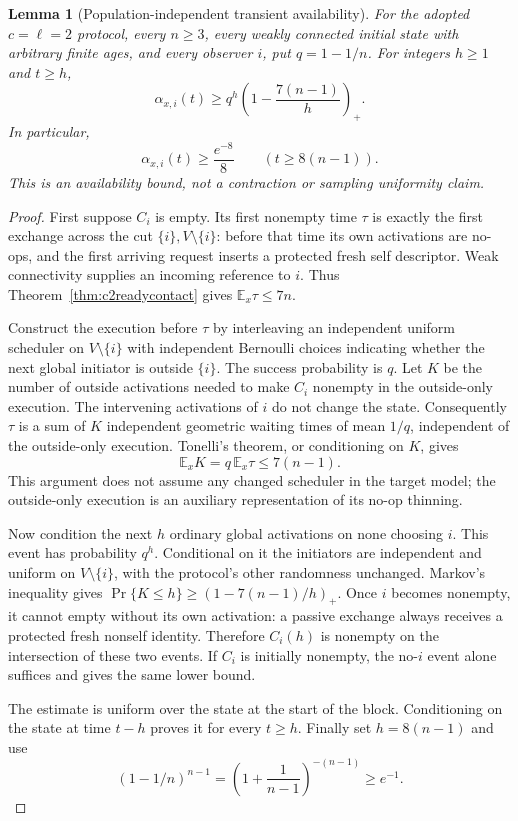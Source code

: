 \documentclass[11pt]{article}
\newtheorem{lemma}[theorem]{Lemma}
\begin{document}
\begin{lemma}[Population-independent transient availability]
\label{lem:c2constanttransientavailability}
For the adopted $c=\ell=2$ protocol, every $n\ge3$, every
weakly connected initial state with arbitrary finite ages,
and every observer $i$, put $q=1-1/n$. For integers $h\ge1$
and $t\ge h$,
\[
 \alpha_{x,i}(t)\ge
 q^h\left(1-\frac{7(n-1)}h\right)_+.
\]
In particular,
\[
 \alpha_{x,i}(t)\ge \frac{e^{-8}}8
 \qquad(t\ge8(n-1)).
\]
This is an availability bound, not a contraction or sampling
uniformity claim.
\end{lemma}
\begin{proof}
First suppose $C_i$ is empty. Its first nonempty time $\tau$
is exactly the first exchange across the cut
$\{i\},V\setminus\{i\}$: before that time its own activations
are no-ops, and the first arriving request inserts a protected
fresh self descriptor. Weak connectivity supplies an incoming
reference to $i$. Thus Theorem~\ref{thm:c2readycontact} gives
$\mathbb E_x\tau\le7n$.

Construct the execution before $\tau$ by interleaving an
independent uniform scheduler on $V\setminus\{i\}$ with
independent Bernoulli choices indicating whether the next
global initiator is outside $\{i\}$. The success probability
is $q$. Let $K$ be the number of outside activations needed
to make $C_i$ nonempty in the outside-only execution.
The intervening activations of $i$ do not change the state.
Consequently $\tau$ is a sum of $K$ independent geometric
waiting times of mean $1/q$, independent of the outside-only
execution. Tonelli's theorem, or conditioning on $K$, gives
\[
 \mathbb E_x K=q\,\mathbb E_x\tau\le7(n-1).
\]
This argument does not assume any changed scheduler in the
target model; the outside-only execution is an auxiliary
representation of its no-op thinning.

Now condition the next $h$ ordinary global activations on
none choosing $i$. This event has probability $q^h$.
Conditional on it the initiators are independent and uniform
on $V\setminus\{i\}$, with the protocol's other randomness
unchanged. Markov's inequality gives
$\Pr\{K\le h\}\ge(1-7(n-1)/h)_+$.
Once $i$ becomes nonempty, it cannot empty without its own
activation: a passive exchange always receives a protected
fresh nonself identity. Therefore $C_i(h)$ is nonempty on
the intersection of these two events. If $C_i$ is initially
nonempty, the no-$i$ event alone suffices and gives the same
lower bound.

The estimate is uniform over the state at the start of the
block. Conditioning on the state at time $t-h$ proves it
for every $t\ge h$. Finally set $h=8(n-1)$ and use
\[
 (1-1/n)^{n-1}
 =\left(1+\frac1{n-1}\right)^{-(n-1)}\ge e^{-1}.
\]
\end{proof}
\end{document}
